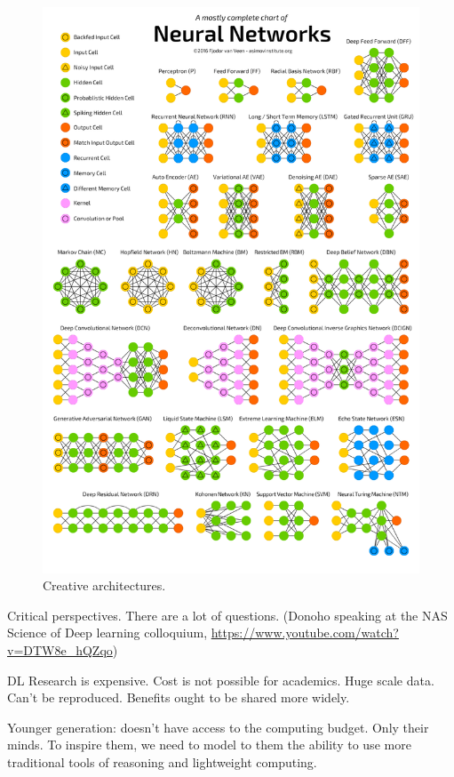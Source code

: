 \documentclass[english]{article}
\begin{document}
 
\begin{figure}
  \centering
  \includegraphics[scale=0.35]{Chart.png}
  \caption{Creative architectures.}
  \label{arch}
\end{figure}

\item Critical perspectives. There are a lot of questions. (Donoho speaking at the NAS Science of Deep learning colloquium, \url{https://www.youtube.com/watch?v=DTW8e_hQZqo})

DL Research is expensive. Cost is not possible for academics. Huge scale data. Can't be reproduced. Benefits ought to be shared more widely. 

Younger generation: doesn't have access to the computing budget. Only their minds. To inspire them, we need to model to them the ability to use more traditional tools of reasoning and lightweight computing.
\end{document}
